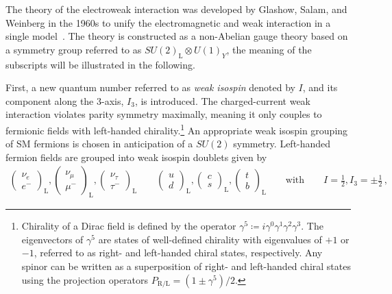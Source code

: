 The theory of the electroweak interaction was developed by Glashow, Salam, and
Weinberg in the 1960s to unify the electromagnetic and weak interaction in a
single model~\cite{Glashow:1961tr,Salam:1964ry,Weinberg:1967tq}. The theory is
constructed as a non-Abelian gauge theory based on a symmetry group referred to
as $SU(2)_{\text{L}} \otimes U(1)_{Y}$, the meaning of the subscripts will be
illustrated in the following.

First, a new quantum number referred to as \emph{weak isospin} denoted by $I$,
and its component along the 3-axis, $I_3$, is introduced. The charged-current
weak interaction violates parity symmetry maximally, meaning it only couples to
fermionic fields with left-handed chirality.\footnote{Chirality of a Dirac field
  is defined by the operator
  $\gamma^5 \coloneq i \gamma^0 \gamma^1 \gamma^2 \gamma^3$. The eigenvectors of
  $\gamma^5$ are states of well-defined chirality with eigenvalues of $+1$ or
  $-1$, referred to as right- and left-handed chiral states, respectively. Any
  spinor can be written as a superposition of right- and left-handed chiral
  states using the projection operators
  $P_{\text{R/L}} = (1 \pm \gamma^5) / 2$.} An appropriate weak isospin grouping
of SM fermions is chosen in anticipation of a $SU(2)$ symmetry.
Left-handed fermion fields are grouped into weak isospin doublets given by
\begin{align*}
  \begin{pmatrix}
    \nu_{e} \\
    e^{-}
  \end{pmatrix}_{\text{L}},
  \begin{pmatrix}
    \nu_{\mu} \\
    \mu^{-}
  \end{pmatrix}_{\text{L}},
  \begin{pmatrix}
    \nu_{\tau} \\
    \tau^{-}
  \end{pmatrix}_{\text{L}}
  \qquad
  \begin{pmatrix}
    u \\
    d
  \end{pmatrix}_{\text{L}},
  \begin{pmatrix}
    c \\
    s
  \end{pmatrix}_{\text{L}},
  \begin{pmatrix}
    t \\
    b
  \end{pmatrix}_{\text{L}}
  \qquad
  \text{with}
  \qquad
  I = \frac{1}{2}, I_3 = \pm \frac{1}{2} \,\text{,}
\end{align*}

